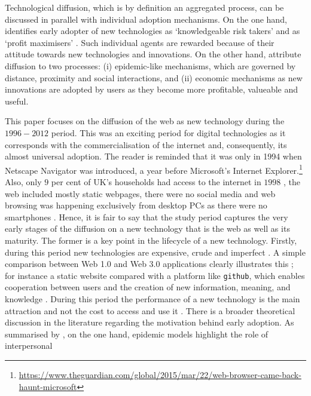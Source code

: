 \documentclass[
  authoryear,
  preprint,
  3p]{elsarticle}
\begin{document}
Technological diffusion, which is by definition an aggregated process,
can be discussed in parallel with individual adoption mechanisms. On the
one hand, \citet{rogers2010diffusion} identifies early adopter of new
technologies as `knowledgeable risk takers' and \citet{griliches1957} as
`profit maximisers' \citep{ding2010modeling}. Such individual agents are
rewarded because of their attitude towards new technologies and
innovations. On the other hand, \citet{perkins2011internet} attribute
diffusion to two processes: (i) epidemic-like mechanisms, which are
governed by distance, proximity and social interactions, and (ii)
economic mechanisms as new innovations are adopted by users as they
become more profitable, valueable and useful.

This paper focuses on the diffusion of the web as new technology during
the \(1996-2012\) period. This was an exciting period for digital
technologies as it corresponds with the commercialisation of the
internet and, consequently, its almost universal adoption. The reader is
reminded that it was only in 1994 when Netscape Navigator was
introduced, a year before Microsoft's Internet Explorer.\footnote{\url{https://www.theguardian.com/global/2015/mar/22/web-browser-came-back-haunt-microsoft}}
Also, only \(9\) per cent of UK's households had access to the internet
in \(1998\) \citep{ons2018}, the web included mostly static webpages,
there were no social media and web browsing was happening exclusively
from desktop PCs as there were no smartphones \citep{tranosuk}. Hence,
it is fair to say that the study period captures the very early stages
of the diffusion on a new technology that is the web as well as its
maturity. The former is a key point in the lifecycle of a new
technology. Firstly, during this period new technologies are expensive,
crude and imperfect \citep{rosenberg1994exploring, wilson201281}. A
simple comparison between Web 1.0 and Web 3.0 applications clearly
illustrates this \citep{tranos2020social}; for instance a static website
compared with a platform like \texttt{github}, which enables cooperation
between users and the creation of new information, meaning, and
knowledge \citep{faraj2016special, barassi2012does}. During this period
the performance of a new technology is the main attraction and not the
cost to access and use it \citep{wilson2011lessons}. There is a broader
theoretical discussion in the literature regarding the motivation behind
early adoption. As summarised by \citet{perkins2005international}, on
the one hand, epidemic models highlight the role of interpersonal
\end{document}
